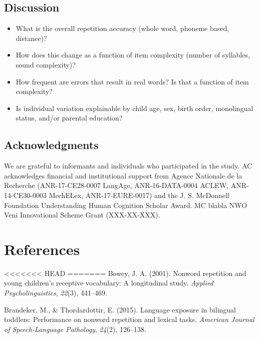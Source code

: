 \documentclass[english,,man,floatsintext]{apa6}
\providecommand{\tightlist}{%
  \setlength{\itemsep}{0pt}\setlength{\parskip}{0pt}}
\begin{document}
\hypertarget{discussion}{%
\subsection{Discussion}\label{discussion}}

\begin{itemize}
\tightlist
\item
  What is the overall repetition accuracy (whole word, phoneme based, distance)?
\item
  How does this change as a function of item complexity (number of syllables, sound complexity)?
\item
  How frequent are errors that result in real words? Is that a function of item complexity?
\item
  Is individual variation explainable by child age, sex, birth order, monolingual status, and/or parental education?
\end{itemize}

\newpage

\hypertarget{acknowledgments}{%
\subsection{Acknowledgments}\label{acknowledgments}}

We are grateful to informants and individuals who participated in the study. AC acknowledges financial and institutional support from Agence Nationale de la Recherche (ANR-17-CE28-0007 LangAge, ANR-16-DATA-0004 ACLEW, ANR-14-CE30-0003 MechELex, ANR-17-EURE-0017) and the J. S. McDonnell Foundation Understanding Human Cognition Scholar Award. MC blabla NWO Veni Innovational Scheme Grant (XXX-XX-XXX).

\hypertarget{references}{%
\section{References}\label{references}}

\setlength{\parindent}{-0.5in}
\setlength{\leftskip}{0.5in}

<<<<<<< HEAD
=======
\hypertarget{refs}{}
\leavevmode\hypertarget{ref-bowey2001nonword}{}%
Bowey, J. A. (2001). Nonword repetition and young children's receptive vocabulary: A longitudinal study. \emph{Applied Psycholinguistics}, \emph{22}(3), 441--469.

\leavevmode\hypertarget{ref-brandeker2015language}{}%
Brandeker, M., \& Thordardottir, E. (2015). Language exposure in bilingual toddlers: Performance on nonword repetition and lexical tasks. \emph{American Journal of Speech-Language Pathology}, \emph{24}(2), 126--138.
\end{document}

